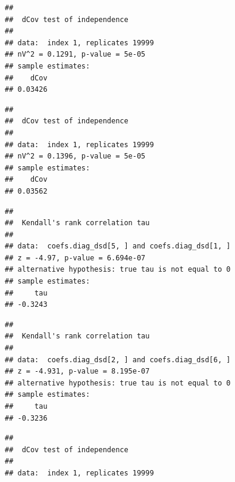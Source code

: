 \documentclass{article}
\begin{document}
\begin{knitrout}
\begin{kframe}
\begin{alltt}
\end{alltt}
\begin{verbatim}
## 
## 	dCov test of independence
## 
## data:  index 1, replicates 19999
## nV^2 = 0.1291, p-value = 5e-05
## sample estimates:
##    dCov 
## 0.03426
\end{verbatim}
\begin{alltt}
\hlstd{(coefs.diag_dsd[}\hlstd{,], coefs.diag_dsd[}\hlstd{,],}  \hlstd{=} \hlstd{)}
\end{alltt}
\begin{verbatim}
## 
## 	dCov test of independence
## 
## data:  index 1, replicates 19999
## nV^2 = 0.1396, p-value = 5e-05
## sample estimates:
##    dCov 
## 0.03562
\end{verbatim}
\begin{alltt}
\hlstd{(coefs.diag_dsd[}\hlstd{,], coefs.diag_dsd[}\hlstd{,],}  \hlstd{=} \hlstd{)}
\end{alltt}
\begin{verbatim}
## 
## 	Kendall's rank correlation tau
## 
## data:  coefs.diag_dsd[5, ] and coefs.diag_dsd[1, ]
## z = -4.97, p-value = 6.694e-07
## alternative hypothesis: true tau is not equal to 0
## sample estimates:
##     tau 
## -0.3243
\end{verbatim}
\begin{alltt}
\hlstd{(coefs.diag_dsd[}\hlstd{,], coefs.diag_dsd[}\hlstd{,],}  \hlstd{=} \hlstd{)}
\end{alltt}
\begin{verbatim}
## 
## 	Kendall's rank correlation tau
## 
## data:  coefs.diag_dsd[2, ] and coefs.diag_dsd[6, ]
## z = -4.931, p-value = 8.195e-07
## alternative hypothesis: true tau is not equal to 0
## sample estimates:
##     tau 
## -0.3236
\end{verbatim}
\begin{alltt}
 \hlkwb{=} \hlstd{coefs.diag_dsd[}\hlstd{,]} \hlopt{-} \hlstd{coefs.diag_dsd[}\hlstd{,]}
 \hlkwb{=} \hlstd{coefs.diag_dsd[}\hlstd{,]} \hlopt{-} \hlstd{coefs.diag_dsd[}\hlstd{,]}
  \hlstd{=} \hlstd{)}
\end{alltt}
\begin{verbatim}
## 
## 	dCov test of independence
## 
## data:  index 1, replicates 19999

\end{verbatim}
\end{kframe}
\end{knitrout}
\end{document}
